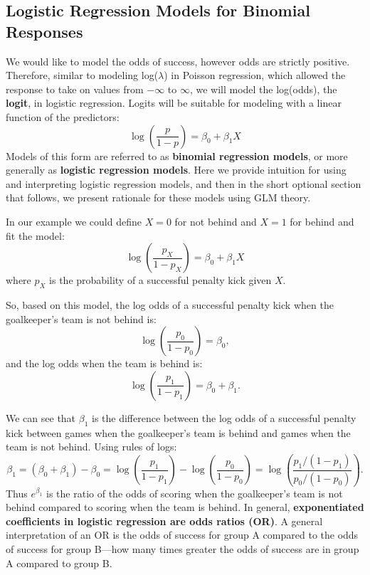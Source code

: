 \documentclass[
]{krantz}
\begin{document}
\hypertarget{logistic-regression-models-for-binomial-responses}{%
\subsection{Logistic Regression Models for Binomial Responses}\label{logistic-regression-models-for-binomial-responses}}

We would like to model the odds of success, however odds are strictly positive. Therefore, similar to modeling log(\(\lambda\)) in Poisson regression, which allowed the response to take on values from \(-\infty\) to \(\infty\), we will model the log(odds), the \textbf{logit}, in logistic regression. Logits will be suitable for modeling with a linear function of the predictors:\\
\begin{equation}
\log\left(\frac{p}{1 - p}\right)=\beta_0+\beta_1X 
\label{eq:binreg}
 \end{equation}
Models of this form are referred to as \textbf{binomial regression models}, or more generally as \textbf{logistic regression models}.  Here we provide intuition for using and interpreting logistic regression models, and then in the short optional section that follows, we present rationale for these models using GLM theory.

In our example we could define \(X=0\) for not behind and \(X=1\) for behind and fit the model:
\begin{equation}
\log\left(\frac{p_X}{1-p_X}\right)=\beta_0 +\beta_1X
\label{eq:logitXform}
\end{equation}
where \(p_X\) is the probability of a successful penalty kick given \(X\).

So, based on this model, the log odds of a successful penalty kick when the goalkeeper's team is not behind is:
\[
\log\left(\frac{p_0}{1-p_0}\right) =\beta_0 \nonumber,
\]
and the log odds when the team is behind is:
\[
\log\left(\frac{p_1}{1-p_1}\right)=\beta_0+\beta_1. \nonumber
\]

We can see that \(\beta_1\) is the difference between the log odds of a successful penalty kick between games when the goalkeeper's team is behind and games when the team is not behind. Using rules of logs:
\begin{equation}
\beta_1 = (\beta_0 + \beta_1) - \beta_0 = 
\log\left(\frac{p_1}{1-p_1}\right) - \log\left(\frac{p_0}{1-p_0}\right) =
\log\left(\frac{p_1/(1-p_1)}{p_0/{(1-p_0)}}\right).
\label{eq:ORform}
\end{equation}
Thus \(e^{\beta_1}\) is the ratio of the odds of scoring when the goalkeeper's team is not behind compared to scoring when the team is behind. In general, \textbf{exponentiated coefficients in logistic regression are odds ratios (OR)}. A general interpretation of an OR is the odds of success for group A compared to the odds of success for group B---how many times greater the odds of success are in group A compared to group B.
\end{document}
